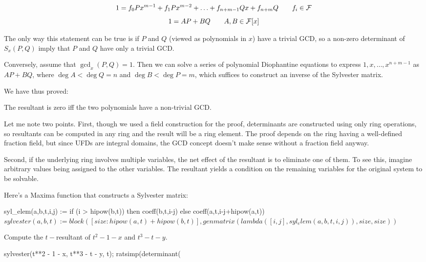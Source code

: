 $$ 1 = f_0 P x^{m-1} + f_1 P x^{m-2} + \ldots + f_{n+m-1} Q x + f_{n+m} Q \qquad f_i \in {\cal F}$$
$$ 1 = A P + B Q \qquad A,B \in {\cal F}[x] $$

The only way this statement can be true is if $P$ and $Q$ (viewed
as polynomials in $x$) have a
trivial GCD, so a non-zero determinant of $S_x(P,Q)$ imply that $P$ and
$Q$ have only a trivial GCD.

Conversely, assume that $\gcd_x(P,Q) = 1$.  Then we can solve a series
of polynomial Diophantine equations to express $1, x, \ldots,
x^{n+m-1}$ as $AP+BQ$, where $\deg A < \deg Q = n$ and $\deg B <
\deg P = m$, which suffices to construct an inverse of the Sylvester
matrix.

We have thus proved:

\begin{theorem}\label{resultant theorem}
The resultant is zero iff the two polynomials have a non-trivial GCD.
\end{theorem}

Let me note two points.  First, though we used a field construction
for the proof, determinants are constructed using only ring
operations, so resultants can be computed in any ring and the result
will be a ring element.  The proof depends on the ring having a
well-defined fraction field, but since UFDs are integral domains, the
GCD concept doesn't make sense without a fraction field anyway.

Second, if the underlying ring involves multiple variables, the net
effect of the resultant is to eliminate one of them.  To see this,
imagine arbitrary values being assigned to the other variables.  The
resultant yields a condition on the remaining variables for the
original system to be solvable.


\vfill\eject

Here's a Maxima function that constructs a Sylvester matrix:

\begin{maximacode}
syl_elem(a,b,t,i,j) :=
   if (i > hipow(b,t))
      then coeff(b,t,i-j)
      else coeff(a,t,i-j+hipow(a,t))$
sylvester(a,b,t) := block(
   [size: hipow(a,t) + hipow(b,t)],
   genmatrix(lambda([i,j], syl_elem(a,b,t,i,j)),
             size, size)
)$
\end{maximacode}

\example Compute the $t-$resultant of $t^2 - 1 -x$ and $t^3-t-y$.

\begin{maximacode}

sylvester(t**2 - 1 - x, t**3 - t - y, t);
ratsimp(determinant(%
\end{maximacode}

